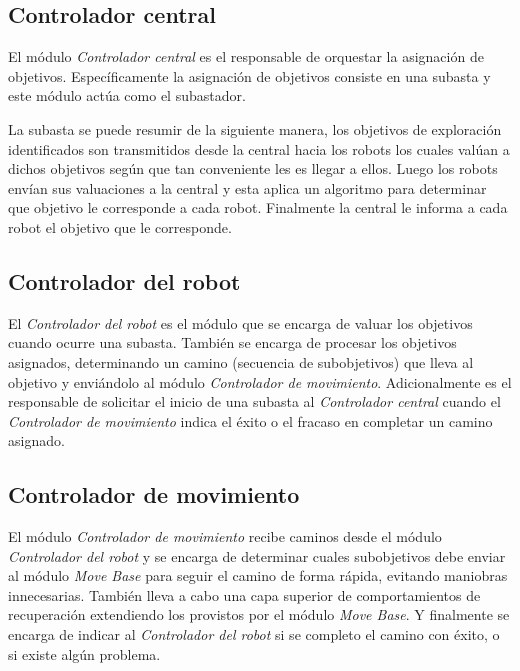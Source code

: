 \subsection{Controlador central}

El módulo \emph{Controlador central} es el responsable de orquestar la
asignación de objetivos. Específicamente la asignación de objetivos consiste en
una subasta y este módulo actúa como el subastador. 

La subasta se puede resumir de la siguiente manera, los objetivos de
exploración identificados son transmitidos desde la central hacia los robots
los cuales valúan a dichos objetivos según que tan conveniente les es llegar a
ellos. Luego los robots envían sus valuaciones a la central y esta aplica un
algoritmo para determinar que objetivo le corresponde a cada robot. Finalmente
la central le informa a cada robot el objetivo que le corresponde.

\subsection{Controlador del robot}
El \emph{Controlador del robot} es el módulo que se encarga de valuar los
objetivos cuando ocurre una subasta. También se encarga de procesar los
objetivos asignados, determinando un camino (secuencia de subobjetivos) que
lleva al objetivo y enviándolo al módulo \emph{Controlador de movimiento}.
Adicionalmente es el responsable de solicitar el inicio de una subasta al
\emph{Controlador central} cuando el \emph{Controlador de movimiento} indica el
éxito o el fracaso en completar un camino asignado.

\subsection{Controlador de movimiento}
El módulo \emph{Controlador de movimiento} recibe caminos desde el módulo
\emph{Controlador del robot} y se encarga de determinar cuales subobjetivos
debe enviar al módulo \emph{Move Base} para seguir el camino de forma rápida,
evitando maniobras innecesarias. También lleva a cabo una capa superior de
comportamientos de recuperación extendiendo los provistos por el módulo
\emph{Move Base}. Y finalmente se encarga de indicar al \emph{Controlador del
robot} si se completo el camino con éxito, o si existe algún problema.

